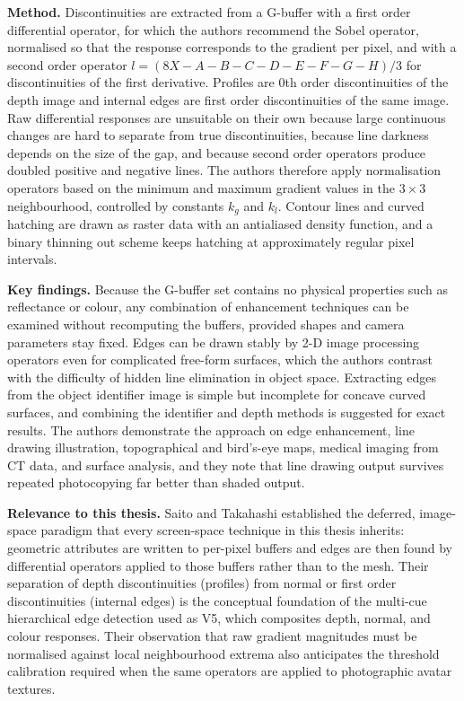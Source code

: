 \documentclass[11pt, a4paper]{article}
\begin{document}
\textbf{Method.} Discontinuities are extracted from a G-buffer with a first order differential operator, for which the authors recommend the Sobel operator, normalised so that the response corresponds to the gradient per pixel, and with a second order operator $l = (8X - A - B - C - D - E - F - G - H)/3$ for discontinuities of the first derivative. Profiles are 0th order discontinuities of the depth image and internal edges are first order discontinuities of the same image. Raw differential responses are unsuitable on their own because large continuous changes are hard to separate from true discontinuities, because line darkness depends on the size of the gap, and because second order operators produce doubled positive and negative lines. The authors therefore apply normalisation operators based on the minimum and maximum gradient values in the $3 \times 3$ neighbourhood, controlled by constants $k_g$ and $k_l$. Contour lines and curved hatching are drawn as raster data with an antialiased density function, and a binary thinning out scheme keeps hatching at approximately regular pixel intervals.

\textbf{Key findings.} Because the G-buffer set contains no physical properties such as reflectance or colour, any combination of enhancement techniques can be examined without recomputing the buffers, provided shapes and camera parameters stay fixed. Edges can be drawn stably by 2-D image processing operators even for complicated free-form surfaces, which the authors contrast with the difficulty of hidden line elimination in object space. Extracting edges from the object identifier image is simple but incomplete for concave curved surfaces, and combining the identifier and depth methods is suggested for exact results. The authors demonstrate the approach on edge enhancement, line drawing illustration, topographical and bird's-eye maps, medical imaging from CT data, and surface analysis, and they note that line drawing output survives repeated photocopying far better than shaded output.

\textbf{Relevance to this thesis.} Saito and Takahashi established the deferred, image-space paradigm that every screen-space technique in this thesis inherits: geometric attributes are written to per-pixel buffers and edges are then found by differential operators applied to those buffers rather than to the mesh. Their separation of depth discontinuities (profiles) from normal or first order discontinuities (internal edges) is the conceptual foundation of the multi-cue hierarchical edge detection used as V5, which composites depth, normal, and colour responses. Their observation that raw gradient magnitudes must be normalised against local neighbourhood extrema also anticipates the threshold calibration required when the same operators are applied to photographic avatar textures.
\end{document}
